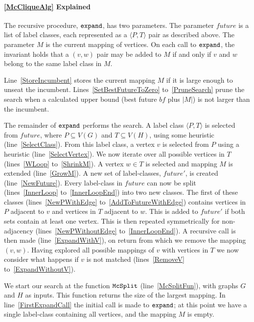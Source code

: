 \documentclass[letterpaper]{article}
\newcommand{\AlgVar}[1]{\mathit{#1}}
\newcommand{\lineref}[1]{line~\ref{#1}}
\newcommand{\linerangeref}[2]{lines~\ref{#1} to~\ref{#2}}
\newcommand{\Lineref}[1]{Line~\ref{#1}}
\newcommand{\Linerangeref}[2]{Lines~\ref{#1} to~\ref{#2}}
\begin{document}
\paragraph{\cref{McCliqueAlg} Explained} The recursive procedure, $\FuncSty{expand}$, has
two parameters.  The parameter $\AlgVar{future}$ is a list of label classes,
each represented as a $\langle P, T \rangle$ pair as described above.  The
parameter $M$ is the current mapping of vertices.  On each call to
$\FuncSty{expand}$, the invariant holds that a $(v,w)$ pair may be added to $M$
if and only if $v$ and $w$ belong to the same label class in $M$.

\Lineref{StoreIncumbent} stores the current mapping $M$ if it is large enough
to unseat the incumbent.  \Linerangeref{SetBestFutureToZero}{PruneSearch} prune
the search when a calculated upper bound (best future $\AlgVar{bf}$ plus $|M|$) is not larger
than the incumbent.

The remainder of $\FuncSty{expand}$ performs the search.  A label class
$\langle P, T \rangle$ is selected from $\AlgVar{future}$, where $P \subseteq
V(G)$ and $T \subseteq V(H)$, using some heuristic (\lineref{SelectClass}).
From this label class, a vertex $v$ is selected from $P$ using a heuristic
(\lineref{SelectVertex}). We now iterate over all possible vertices in $T$
(\linerangeref{WLoop}{ShrinkM}). A vertex $w \in T$ is selected and mapping $M$
is extended (\lineref{GrowM}). A new set of label-classes, $\AlgVar{future'}$,
is created (\lineref{NewFuture}).  Every label-class in $\AlgVar{future}$ can
now be split (\linerangeref{InnerLoop}{InnerLoopEnd}) into two new classes. The
first of these classes (\linerangeref{NewPWithEdge}{AddToFutureWithEdge})
contains vertices in $P$ adjacent to $v$ and vertices in $T$ adjacent to $w$.
This is added to $\AlgVar{future'}$ if both sets contain at least one vertex.
This is then repeated symmetrically for non-adjacency
(\linerangeref{NewPWithoutEdge}{InnerLoopEnd}). A recursive call is then made
(\lineref{ExpandWithV}), on return from which we remove the mapping $(v,w)$.
Having explored all possible mappings of $v$ with vertices in $T$ we now
consider what happens if $v$ is not matched
(\linerangeref{RemoveV}{ExpandWithoutV}).

We start our search at the function $\FuncSty{McSplit}$ (\lineref{McSplitFun}),
with graphs $G$ and $H$ as inputs.  This function returns the size of the
largest mapping.  In \lineref{FirstExpandCall} the initial call is made to
$\FuncSty{expand}$; at this point we have a single label-class containing all
vertices, and the mapping $M$ is empty.
\end{document}
